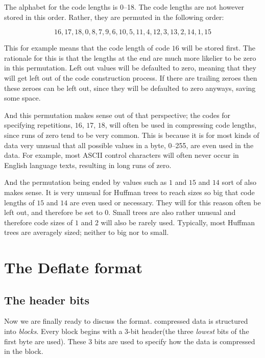 The alphabet for the code lengths is 0--18. The code lengths are not
however stored in this order. Rather, they are permuted in the
following order:

\begin{equation*}
  16, 17, 18, 0, 8, 7, 9, 6, 10, 5, 11, 4, 12, 3, 13, 2, 14, 1, 15
\end{equation*}

This for example means that the code length of code $16$ will be
stored first. The rationale for this is that the lengths at the end
are much more likelier to be zero in this permutation. Left out values
will be defaulted to zero, meaning that they will get left out of the
code construction process. If there are trailing zeroes then these
zeroes can be left out, since they will be defaulted to zero anyways,
saving some space.

And this permutation makes sense out of that perspective; the codes
for specifying repetitions, $16$, $17$, $18$, will often be used in
compressing code lengths, since runs of zero tend to be very
common. This is because it is for most kinds of data very unusual that
all possible values in a byte, 0--255, are even used in the data. For
example, most ASCII control characters will often never occur in
English language texts, resulting in long runs of zero.

And the permutation being ended by values such as $1$ and $15$ and
$14$ sort of also makes sense. It is very unusual for Huffman trees to
reach sizes so big that code lengths of $15$ and $14$ are even used or
necessary. They will for this reason often be left out, and therefore
be set to $0$. Small trees are also rather unusual and therefore code
sizes of $1$ and $2$ will also be rarely used. Typically, most Huffman
trees are averagely sized; neither to big nor to small.

\section{The Deflate format}

\subsection{The header bits}

Now we are finally ready to discuss the  format. 
compressed data is structured into \textit{blocks}. Every block begins
with a 3-bit header(the three \textit{lowest} bits of the first byte
are used). These 3 bits are used to specify how the data is compressed
in the block.

